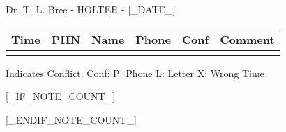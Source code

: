 \documentclass[12pt]{article}
\newenvironment{my_enumerate}{
\begin{enumerate}
  \setlength{\itemsep}{1pt}
  \setlength{\parskip}{0pt}
  \setlength{\parsep}{0pt}}{\end{enumerate}
}
\begin{document}
\begin{center}
{\Large Dr. T. L. Bree - HOLTER - [_DATE_]} \\[.5pc]
\end{center}


\footnotesize
\vspace{0.12in}

\begin{center}
\begin{tabular}{rllrll}
\textbf{Time} & \textbf{PHN} & \textbf{Name} & \textbf{Phone} & \textbf{Conf} & \textbf{Comment} \\
\midrule
[_CONTENTS_]
\bottomrule
\vspace{-0.40in}
\end{tabular}
\end{center}

\begin{center}
{\scriptsize * Indicates Conflict.  Conf: P: Phone L: Letter X: Wrong Time}
\end{center}


[_IF_NOTE_COUNT_]
\begin{my_enumerate}
[_NOTES_]
\end{my_enumerate}
[_ENDIF_NOTE_COUNT_]
\end{document}
